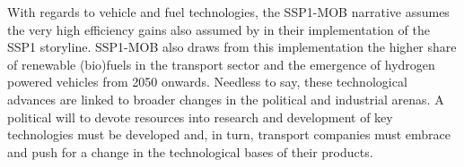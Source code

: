 With regards to vehicle and fuel technologies, the SSP1-MOB narrative assumes the very high efficiency gains also assumed by \textcite{vuuren2017_Energylanduse} in their implementation of the SSP1 storyline. SSP1-MOB also draws from this implementation the higher share of renewable (bio)fuels in the transport sector and the emergence of hydrogen powered vehicles from 2050 onwards. Needless to say, these technological advances are linked to broader changes in the political and industrial arenas. A political will to devote resources into research and development of key technologies must be developed and, in turn, transport companies must embrace and push for a change in the technological bases of their products.


